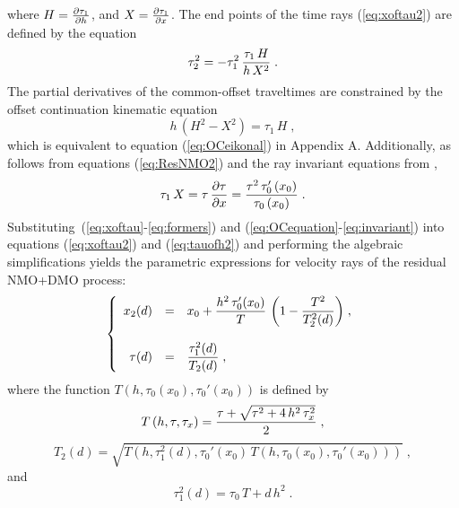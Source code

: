 where $H = {{\partial \tau_1} \over {\partial h}}$, and $X =
{{\partial \tau_1} \over {\partial x}}$. 
The end points of the time rays (\ref{eq:xoftau2}) are defined by the
equation
\begin{equation}
\tau_2^2 = - \tau_1^2\,{{\tau_1\,H} \over {h\,X^2}}\;.
\label{eq:tauofh2}
\end{equation}
The partial derivatives of the common-offset traveltimes are
constrained by the offset continuation kinematic equation
\begin{equation}
h\,(H^2 - X^2) = \tau_1\,H\;,
\label{eq:OCequation}
\end{equation}
which is equivalent to equation (\ref{eq:OCeikonal}) in Appendix
A. Additionally, as follows from equations (\ref{eq:ResNMO2}) and the ray
invariant equations from \cite[]{ofcon},
\begin{equation}
\tau_1\,X = \tau\,{{\partial \tau} \over {\partial x}} = 
{{\tau^2\,\tau_0'\left(x_0\right)} \over {\tau_0\left(x_0\right)}}\;.
\label{eq:invariant}
\end{equation}
Substituting~(\ref{eq:xoftau}-\ref{eq:formers}) and
(\ref{eq:OCequation}-\ref{eq:invariant}) into equations
(\ref{eq:xoftau2}) and (\ref{eq:tauofh2}) and performing the algebraic
simplifications yields the parametric expressions for velocity
rays of the residual NMO+DMO process:
\begin{equation}
\left\{
\begin{array}{rcl}
x_2(d) & = & \displaystyle{x_0 + {{h^2\,\tau_0'(x_0)} \over T}\,
\left(1 - {T^2 \over T_2^2(d)}\right)}\;,
\\ 
\\
\tau(d) & = & \displaystyle{{{\tau_1^2(d)} \over {T_2(d)}}}\;,
\end{array}
\right.
\label{eq:ResDMO2}
\end{equation}
where the function
$T\left(h,\tau_0(x_0),\tau_0'\left(x_0\right)\right)$ is defined by
\begin{equation}
T\left(h,\tau,\tau_x\right) = 
{{\tau + \sqrt{\tau^2 + 4\,h^2\,\tau_x^2}} \over 2}\;,
\label{eq:CapT}
\end{equation}
\begin{equation}
T_2(d) = \sqrt{T\left(h,\tau_1^2(d),\tau_0'\left(x_0\right)\,
T\left(h,\tau_0(x_0),\tau_0'\left(x_0\right)\right)\right)}\;,
\label{eq:CapT2}
\end{equation}
and
\begin{equation}
\tau_1^2(d) = \tau_0\,T + d\,h^2\;.
\label{eq:tauofs}
\end{equation}

